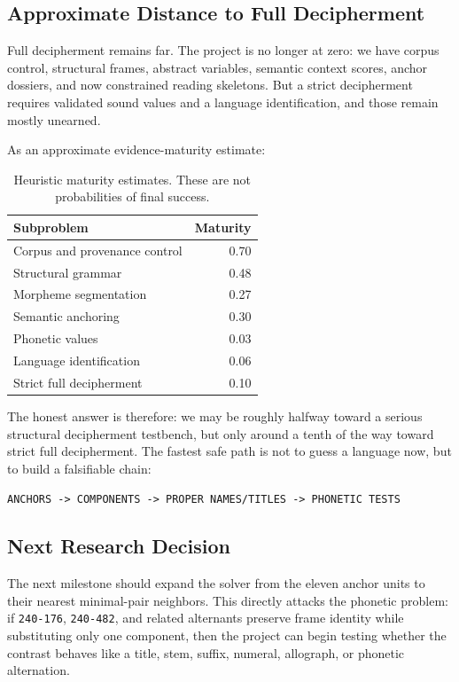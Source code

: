 \subsection{Approximate Distance to Full Decipherment}

Full decipherment remains far. The project is no longer at zero: we have corpus control, structural frames, abstract variables, semantic context scores, anchor dossiers, and now constrained reading skeletons. But a strict decipherment requires validated sound values and a language identification, and those remain mostly unearned.

As an approximate evidence-maturity estimate:

\begin{table}[htbp]
\centering
\begin{tabular}{lr}
\toprule
\textbf{Subproblem} & \textbf{Maturity} \\
\midrule
Corpus and provenance control & 0.70 \\
Structural grammar & 0.48 \\
Morpheme segmentation & 0.27 \\
Semantic anchoring & 0.30 \\
Phonetic values & 0.03 \\
Language identification & 0.06 \\
Strict full decipherment & 0.10 \\
\bottomrule
\end{tabular}
\caption{Heuristic maturity estimates. These are not probabilities of final success.}
\label{tab:decipherment-distance}
\end{table}

The honest answer is therefore: we may be roughly halfway toward a serious structural decipherment testbench, but only around a tenth of the way toward strict full decipherment. The fastest safe path is not to guess a language now, but to build a falsifiable chain:

\begin{center}
\texttt{ANCHORS -> COMPONENTS -> PROPER NAMES/TITLES -> PHONETIC TESTS}
\end{center}

\subsection{Next Research Decision}

The next milestone should expand the solver from the eleven anchor units to their nearest minimal-pair neighbors. This directly attacks the phonetic problem: if \texttt{240-176}, \texttt{240-482}, and related alternants preserve frame identity while substituting only one component, then the project can begin testing whether the contrast behaves like a title, stem, suffix, numeral, allograph, or phonetic alternation.

